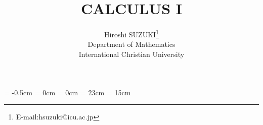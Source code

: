 
\topmargin = -0.5cm
\oddsidemargin = 0cm \evensidemargin = 0cm
\textheight = 23cm \textwidth = 15cm %

\title{CALCULUS I}
      
\author{Hiroshi SUZUKI\thanks{E-mail:hsuzuki@icu.ac.jp}\\ 
        Department of Mathematics \\ 
        International Christian University}

\renewcommand{\thepage}{%
	\arabic{section}--\arabic{page}}
\newcommand{\mysection}[1]{%
	\section{#1}\setcounter{page}{1}}

\newtheorem{thm}{定理}[section]
\newtheorem{prop}[thm]{命題}
\newtheorem{lemma}[thm]{補題}
\newtheorem{cor}[thm]{系}
\newtheorem{exercise}{練習問題}[section]
\newtheorem{example}{例}[section]
\newtheorem{problem}{問題}[section]
\newtheorem{defin}{定義}[section]
\newenvironment{definition}{\begin{defin} \rm}{\end{defin}}
\newenvironment{ex}{\begin{exercise} \rm}{\end{exercise}}
\newenvironment{eg}{\begin{example} \rm}{\end{example}}
\newenvironment{prob}{\begin{problem} \rm}{\end{problem}}
\newcommand{\remarks}{\vspace{2ex}\noindent{\bf Remarks.\quad}}
\newcommand{\note}{\vspace{2ex}\noindent{\gt 注\quad}}
\newcommand{\proof}{{\gt 証明\quad}}
\newcommand{\qed}{\hfill\hbox{\rule{6pt}{6pt}}}
\newcommand{\bZ}{\mbox{\boldmath $Z$}}
\newcommand{\bR}{\mbox{\boldmath $R$}}
\newcommand{\bC}{\mbox{\boldmath $C$}}
\newcommand{\bQ}{\mbox{\boldmath $Q$}}


